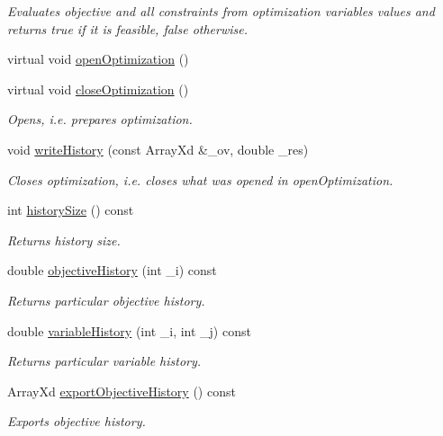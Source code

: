 \begin{DoxyCompactItemize}
\begin{DoxyCompactList}\small\item\em Evaluates objective and all constraints from optimization variables values and returns true if it is feasible, false otherwise. \end{DoxyCompactList}\item 
virtual void \hyperlink{class_c_optimization_problem_af06324e65035961b500de11edcdab889}{open\-Optimization} ()
\item 
virtual void \hyperlink{class_c_optimization_problem_a30fa53ab400882df886d28109ed92ea1}{close\-Optimization} ()
\begin{DoxyCompactList}\small\item\em Opens, i.\-e. prepares optimization. \end{DoxyCompactList}\item 
void \hyperlink{class_c_optimization_problem_a36a9c34a0e2a09929d2fc05839836603}{write\-History} (const Array\-Xd \&\-\_\-ov, double \-\_\-res)
\begin{DoxyCompactList}\small\item\em Closes optimization, i.\-e. closes what was opened in open\-Optimization. \end{DoxyCompactList}\item 
int \hyperlink{class_c_optimization_problem_ae1aa05b9f3328cf2dc77a29ad120ec22}{history\-Size} () const 
\begin{DoxyCompactList}\small\item\em Returns history size. \end{DoxyCompactList}\item 
double \hyperlink{class_c_optimization_problem_a54e11507c7aeb08e8b5dfadafb285ab7}{objective\-History} (int \-\_\-i) const 
\begin{DoxyCompactList}\small\item\em Returns particular objective history. \end{DoxyCompactList}\item 
double \hyperlink{class_c_optimization_problem_a0bcf4f49c2bb0e5f9aad9fa33a26bdc6}{variable\-History} (int \-\_\-i, int \-\_\-j) const 
\begin{DoxyCompactList}\small\item\em Returns particular variable history. \end{DoxyCompactList}\item 
Array\-Xd \hyperlink{class_c_optimization_problem_a318e826a400755d4c15852af1fb2962c}{export\-Objective\-History} () const 
\begin{DoxyCompactList}\small\item\em Exports objective history. \end{DoxyCompactList}\end{DoxyCompactItemize}
